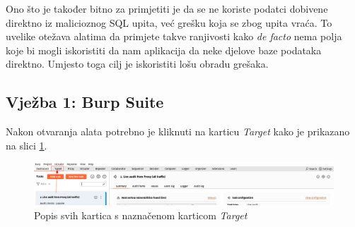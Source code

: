 Ono što je također bitno za primjetiti je da se ne koriste podatci dobivene direktno iz malicioznog SQL upita, već grešku koja se zbog upita vraća. To uvelike otežava alatima da primjete takve ranjivosti kako \textit{de facto} nema polja koje bi mogli iskoristiti da nam aplikacija da neke djelove baze podataka direktno. 
Umjesto toga cilj je iskoristiti lošu obradu grešaka.\cite{sql_lab} 

\subsection{Vježba 1: Burp Suite}
Nakon otvaranja alata potrebno je kliknuti na karticu \textit{Target} kako je prikazano na slici \ref{slk:target_burp}.
\begin{figure}[H]
    \centering
    \includegraphics[width=1\textwidth]{slike/BURP_target.png}
    \caption{Popis svih kartica s naznačenom karticom \textit{Target}}
    \label{slk:target_burp}
\end{figure}

